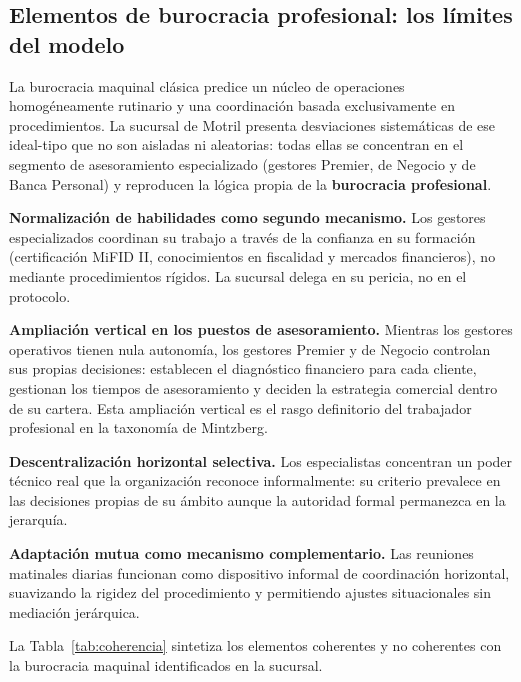 \subsection{Elementos de burocracia profesional: los límites del modelo}

La burocracia maquinal clásica predice un núcleo de operaciones homogéneamente
rutinario y una coordinación basada exclusivamente en procedimientos. La sucursal
de Motril presenta desviaciones sistemáticas de ese ideal-tipo que no son aisladas
ni aleatorias: todas ellas se concentran en el segmento de asesoramiento especializado
(gestores Premier, de Negocio y de Banca Personal) y reproducen la lógica propia de
la \textbf{burocracia profesional}.

\textbf{Normalización de habilidades como segundo mecanismo.}
Los gestores especializados coordinan su trabajo a través de la confianza en su
formación (certificación MiFID II, conocimientos en fiscalidad y mercados financieros),
no mediante procedimientos rígidos. La sucursal delega en su pericia, no en el
protocolo.

\textbf{Ampliación vertical en los puestos de asesoramiento.}
Mientras los gestores operativos tienen nula autonomía, los gestores Premier y de
Negocio controlan sus propias decisiones: establecen el diagnóstico financiero para
cada cliente, gestionan los tiempos de asesoramiento y deciden la estrategia
comercial dentro de su cartera. Esta ampliación vertical es el rasgo definitorio
del trabajador profesional en la taxonomía de Mintzberg.

\textbf{Descentralización horizontal selectiva.}
Los especialistas concentran un poder técnico real que la organización reconoce
informalmente: su criterio prevalece en las decisiones propias de su ámbito aunque
la autoridad formal permanezca en la jerarquía.

\textbf{Adaptación mutua como mecanismo complementario.}
Las reuniones matinales diarias funcionan como dispositivo informal de coordinación
horizontal, suavizando la rigidez del procedimiento y permitiendo ajustes situacionales
sin mediación jerárquica.

La Tabla~\ref{tab:coherencia} sintetiza los elementos coherentes y no coherentes con
la burocracia maquinal identificados en la sucursal.

